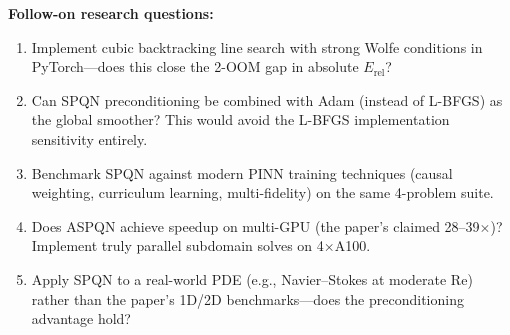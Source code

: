 \noindent\textbf{Follow-on research questions:}
\begin{enumerate}[leftmargin=1.6em,itemsep=0.2em,topsep=0.2em,label=Q\arabic*.]
\item Implement cubic backtracking line search with strong Wolfe conditions in PyTorch---does this close the 2-OOM gap in absolute $E_{\mathrm{rel}}$?
\item Can SPQN preconditioning be combined with Adam (instead of L-BFGS) as the global smoother? This would avoid the L-BFGS implementation sensitivity entirely.
\item Benchmark SPQN against modern PINN training techniques (causal weighting, curriculum learning, multi-fidelity) on the same 4-problem suite.
\item Does ASPQN achieve speedup on multi-GPU (the paper's claimed 28--39$\times$)? Implement truly parallel subdomain solves on 4$\times$A100.
\item Apply SPQN to a real-world PDE (e.g., Navier--Stokes at moderate Re) rather than the paper's 1D/2D benchmarks---does the preconditioning advantage hold?
\end{enumerate}

